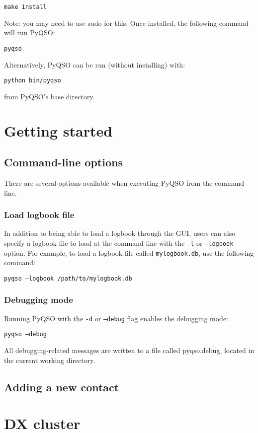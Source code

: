 \documentclass[11pt, a4paper]{report}
\begin{document}
  \texttt{make install}

\noindent Note: you may need to use sudo for this. Once installed, the following command will run PyQSO:

  \texttt{pyqso}

\noindent Alternatively, PyQSO can be run (without installing) with:

  \texttt{python bin/pyqso}

\noindent from PyQSO's base directory.



\chapter{Getting started}

\section{Command-line options}
There are several options available when executing PyQSO from the command-line.

\subsection{Load logbook file}
In addition to being able to load a logbook through the GUI, users can also specify a logbook file to load at the command line with the \texttt{-l} or \texttt{--logbook} option. For example, to load a logbook file called \texttt{mylogbook.db}, use the following command:

  \texttt{pyqso --logbook /path/to/mylogbook.db}

\subsection{Debugging mode}
Running PyQSO with the \texttt{-d} or \texttt{--debug} flag enables the debugging mode:

  \texttt{pyqso --debug}

\noindent All debugging-related messages are written to a file called pyqso.debug, located in the current working directory.

\section{Adding a new contact}


\chapter{DX cluster}




\end{document}
